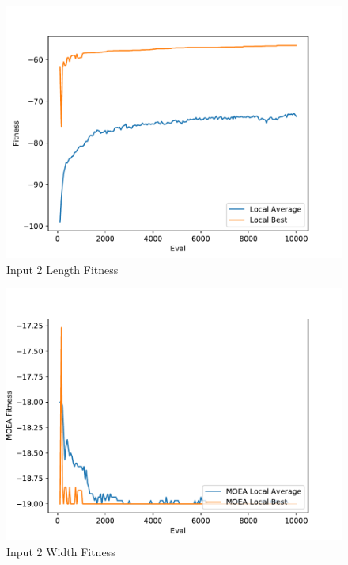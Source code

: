 \documentclass{standalone}
\begin{document}
\begin{figure}[!htb]
	\caption{Input 2 Length Fitness}
	\label{fig:graph_2005}
	\includegraphics[width=\textwidth]{../graphs/graphs/2005.pdf}
\end{figure}


\begin{figure}[!htb]
	\caption{Input 2 Width Fitness}
	\label{fig:graph_2005_moea}
	\includegraphics[width=\textwidth]{../graphs/graphs/2005_moea.pdf}
\end{figure}
\end{document}
